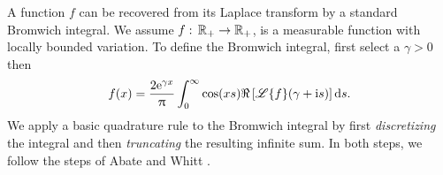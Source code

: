 A function $f$ can be recovered from its Laplace transform by a standard Bromwich integral.
We assume $f:\,\mathbb{R}_+ \to \mathbb{R}_+$, is a measurable function with locally bounded variation.
To define the Bromwich integral, first select a $\gamma > 0$ then
\[
f(x)=\frac{2\mathrm{e}^{\gamma x}}{\uppi}\int_{0}^{\infty}\cos(xs)\Re\left[\mathscr{L}\{f\}(\gamma + \mathrm{i} s)\right]\mathop{}\!\mathrm{d} s.
\]
We apply a basic quadrature rule to the Bromwich integral by first \emph{discretizing} the integral and then \emph{truncating} the resulting infinite sum. In both steps, we follow the steps of Abate and Whitt \cite{Abate1992}.

